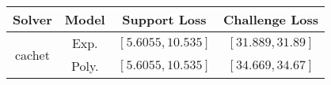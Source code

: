 \begin{tabular}{cc|c|c} 
\hline 
 Solver & Model & Support Loss  & Challenge Loss \tabularnewline\hline 
\hline 
\multirow{2}{*}{cachet} & Exp. & $\mathbf{\left[5.6055,10.535\right]}$ & $\mathbf{\left[31.889,31.89\right]}$ \tabularnewline 
 & Poly. & $\left[5.6055,10.535\right]$ & $\left[34.669,34.67\right]$ \tabularnewline 
\hline 
\end{tabular} 

